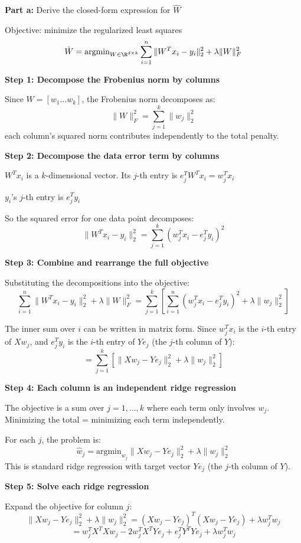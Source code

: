 \documentclass{article}
\begin{document}
\begin{mdframed}
\textbf{\large Part a:} Derive the closed-form expression for $\hat{W}$
\end{mdframed}

Objective: minimize the regularized least squares
\[
    \hat{W} = \text{argmin}_{W \in \R^{d \times k}} \sum_{i=1}^{n} \|W^T x_i - y_i\|_2^2 + \lambda\|W\|_F^2
\]

\medskip
\textbf{Step 1: Decompose the Frobenius norm by columns}

Since $W = [w_1 \ldots w_k]$, the Frobenius norm decomposes as:
\[
    \|W\|_F^2 = \sum_{j=1}^{k} \|w_j\|_2^2
\]
each column's squared norm contributes independently to the total penalty.

\medskip
\textbf{Step 2: Decompose the data error term by columns}

$W^T x_i$ is a $k$-dimensional vector. Its $j$-th entry is $e_j^T W^T x_i = w_j^T x_i$

$y_i$'s $j$-th entry is $e_j^T y_i$

So the squared error for one data point decomposes:
\[
    \|W^T x_i - y_i\|_2^2 = \sum_{j=1}^{k} (w_j^T x_i - e_j^T y_i)^2
\]

\medskip
\textbf{Step 3: Combine and rearrange the full objective}

Substituting the decompositions into the objective:
\[
    \sum_{i=1}^{n} \|W^T x_i - y_i\|_2^2 + \lambda\|W\|_F^2 = \sum_{j=1}^{k} \left[ \sum_{i=1}^{n} (w_j^T x_i - e_j^T y_i)^2 + \lambda\|w_j\|_2^2 \right]
\]

The inner sum over $i$ can be written in matrix form. Since $w_j^T x_i$ is the $i$-th entry of $Xw_j$, and $e_j^T y_i$ is the $i$-th entry of $Ye_j$ (the $j$-th column of $Y$):
\[
    = \sum_{j=1}^{k} \left[ \|Xw_j - Ye_j\|_2^2 + \lambda\|w_j\|_2^2 \right]
\]

\medskip
\textbf{Step 4: Each column is an independent ridge regression}

The objective is a sum over $j = 1, \ldots, k$ where each term only involves $w_j$. Minimizing the total = minimizing each term independently.

For each $j$, the problem is:
\[
    \hat{w}_j = \text{argmin}_{w_j} \|Xw_j - Ye_j\|_2^2 + \lambda\|w_j\|_2^2
\]
This is standard ridge regression with target vector $Ye_j$ (the $j$-th column of $Y$).

\medskip
\textbf{Step 5: Solve each ridge regression}

Expand the objective for column $j$:
\[
    \|Xw_j - Ye_j\|_2^2 + \lambda\|w_j\|_2^2 = (Xw_j - Ye_j)^T(Xw_j - Ye_j) + \lambda w_j^T w_j
\]
\[
    = w_j^T X^T X w_j - 2w_j^T X^T Y e_j + e_j^T Y^T Y e_j + \lambda w_j^T w_j
\]
\end{document}

